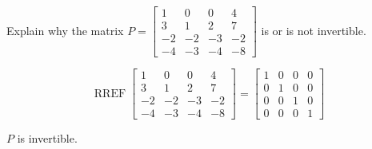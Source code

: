 
\begin{exerciseStatement}


Explain why the matrix \(P= \left[\begin{array}{cccc}
1 & 0 & 0 & 4 \\
3 & 1 & 2 & 7 \\
-2 & -2 & -3 & -2 \\
-4 & -3 & -4 & -8
\end{array}\right] \) is or is not invertible.


\end{exerciseStatement}
    
\begin{exerciseAnswer} 


\[\operatorname{RREF} \left[\begin{array}{cccc}
1 & 0 & 0 & 4 \\
3 & 1 & 2 & 7 \\
-2 & -2 & -3 & -2 \\
-4 & -3 & -4 & -8
\end{array}\right] = \left[\begin{array}{cccc}
1 & 0 & 0 & 0 \\
0 & 1 & 0 & 0 \\
0 & 0 & 1 & 0 \\
0 & 0 & 0 & 1
\end{array}\right] \]

\(P\) is invertible.
\end{exerciseAnswer}
    

